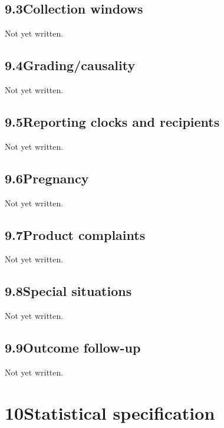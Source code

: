 \documentclass[11pt,a4paper]{article}
\newcommand{\psnote}[2]{\par\noindent\colorbox{#1!8}{\parbox{\dimexpr\linewidth-2\fboxsep}{\small\color{#1}#2}}\par}
\begin{document}
\subsection{9.3\quad Collection windows}\label{section.9.3}
\psnote{pswarn}{Not yet written.}
\subsection{9.4\quad Grading/causality}\label{section.9.4}
\psnote{pswarn}{Not yet written.}
\subsection{9.5\quad Reporting clocks and recipients}\label{section.9.5}
\psnote{pswarn}{Not yet written.}
\subsection{9.6\quad Pregnancy}\label{section.9.6}
\psnote{pswarn}{Not yet written.}
\subsection{9.7\quad Product complaints}\label{section.9.7}
\psnote{pswarn}{Not yet written.}
\subsection{9.8\quad Special situations}\label{section.9.8}
\psnote{pswarn}{Not yet written.}
\subsection{9.9\quad Outcome follow-up}\label{section.9.9}
\psnote{pswarn}{Not yet written.}
\section{10\quad Statistical specification}\label{section.10}
\end{document}
